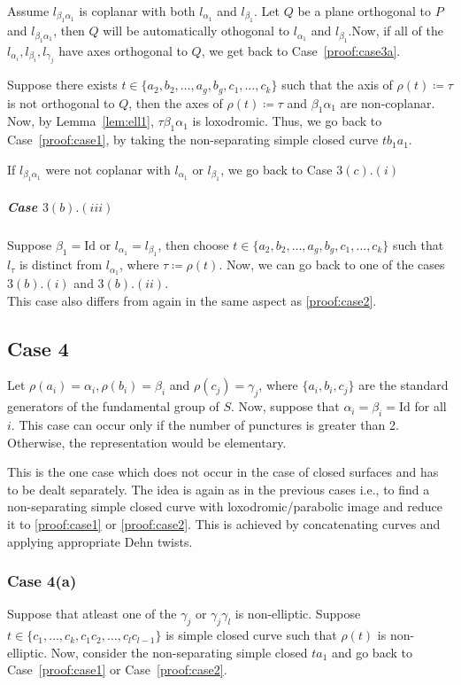 Assume $l_{\beta_1 \alpha_1}$ is coplanar with both $l_{\alpha_1}$ and $l_{\beta_1}$. Let $Q$ be a plane orthogonal to $P$ and $l_{\beta_1 \alpha_1}$, then $Q$ will be automatically othogonal to $l_{\alpha_1}$ and $l_{\beta_1}$.Now, if all of the $l_{\alpha_i}, l_{\beta_i}, l_{\gamma_j}$ have axes orthogonal to $Q$, we get back to Case~\ref{proof:case3a}. 

Suppose there exists $t \in \{a_2, b_2, \ldots, a_g, b_g,c_1,\ldots,c_k\}$ such that the axis of $\rho(t) \coloneqq \tau$ is not orthogonal to $Q$, then the axes of $\rho(t) \coloneqq \tau $ and $\beta_1 \alpha_1$ are non-coplanar. Now, by Lemma~\ref{lem:ell1}, $\tau \beta_1 \alpha_1$ is loxodromic. Thus, we go back to Case~\ref{proof:case1}, by taking the non-separating simple closed curve $t b_1 a_1$.

If $l_{\beta_1 \alpha_1}$ were not coplanar with $l_{\alpha_1}$ or $l_{\beta_1}$, we go back to Case $3(c).(i)$\\

\subparagraph{Case $3(b).(iii)$} Suppose $\beta_1 = \text{Id}$ or $l_{\alpha_1} = l_{\beta_1}$, then choose $t \in \{a_2, b_2, \ldots, a_g, b_g,c_1,\ldots,c_k\}$ such that $l_{\tau}$ is distinct from $l_{\alpha_1}$, where $\tau \coloneqq \rho(t)$. Now, we can go back to one of the cases $3(b).(i)$ and $3(b).(ii)$.\\

This case also differs from \cite{GKM} again in the same aspect as \ref{proof:case2}.

\subsection{Case 4} \label{proof:case4} Let $\rho(a_i) = \alpha _i, \rho(b_i) = \beta_i$ and $\rho(c_j)= \gamma_j$, where $\{a_i,b_i,c_j\}$ are the standard generators of the fundamental group of $S$. Now, suppose that $\alpha_i = \beta_i = \text{Id}$ for all $i$. This case can occur only if the number of punctures is greater than 2. Otherwise, the representation would be elementary.

This is the one case which does not occur in the case of closed surfaces and has to be dealt separately. The idea is again as in the previous cases i.e., to find a non-separating simple closed curve with loxodromic/parabolic image and reduce it to \ref{proof:case1} or \ref{proof:case2}. This is achieved by concatenating curves and applying appropriate Dehn twists.

\subsubsection{Case 4(a)} \label{proof:case4a} Suppose that atleast one of the $\gamma_j$ or $\gamma_j \gamma_l$ is non-elliptic. Suppose $t \in \{c_1,\ldots,c_k,c_1c_2,\ldots,c_{l}c_{l-1}\}$ is simple closed curve such that $\rho(t)$ is non-elliptic. Now, consider the non-separating simple closed $t a_1$ and go back to Case~\ref{proof:case1} or Case~\ref{proof:case2}.    

